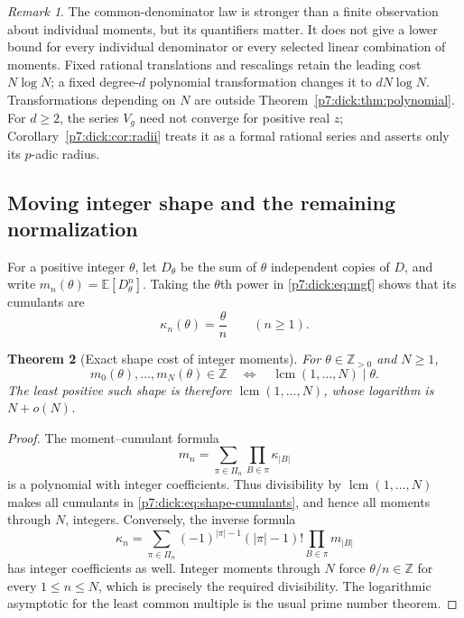 \documentclass[11pt,a4paper]{article}
\newtheorem{theorem}{Theorem}[section]
\theoremstyle{definition}
\theoremstyle{remark}
\newtheorem{remark}[theorem]{Remark}
\newcommand{\Z}{\mathbb Z}
\DeclareMathOperator{\lcm}{lcm}
\numberwithin{equation}{section}
\begin{document}
\begin{remark}\label{p7:dick:rem:scope}
The common-denominator law is stronger than a finite observation about
individual moments, but its quantifiers matter.  It does not give a lower
bound for every individual denominator or every selected linear combination
of moments.  Fixed rational translations and rescalings retain the leading
cost $N\log N$; a fixed degree-$d$ polynomial transformation changes it to
$dN\log N$.  Transformations depending on $N$ are outside
Theorem~\ref{p7:dick:thm:polynomial}.  For $d\ge2$, the series $V_g$ need not
converge for positive real $z$; Corollary~\ref{p7:dick:cor:radii} treats it as
a formal rational series and asserts only its $p$-adic radius.
\end{remark}

\subsection{Moving integer shape and the remaining normalization}

For a positive integer $\theta$, let $D_\theta$ be the sum of $\theta$
independent copies of $D$, and write
$m_n(\theta)=\mathbb E[D_\theta^n]$.  Taking the $\theta$th power in
\eqref{p7:dick:eq:mgf} shows that its cumulants are
\begin{equation}\label{p7:dick:eq:shape-cumulants}
 \kappa_n(\theta)=\frac{\theta}{n}\qquad(n\ge1).
\end{equation}

\begin{theorem}[Exact shape cost of integer moments]\label{p7:dick:thm:shape}
For $\theta\in\Z_{>0}$ and $N\ge1$,
\begin{equation}\label{p7:dick:eq:shape-integrality}
 m_0(\theta),\ldots,m_N(\theta)\in\Z
 \quad\Longleftrightarrow\quad
 \lcm(1,\ldots,N)\mid\theta.
\end{equation}
The least positive such shape is therefore $\lcm(1,\ldots,N)$, whose
logarithm is $N+o(N)$.
\end{theorem}
\begin{proof}
The moment--cumulant formula
\[
 m_n=\sum_{\pi\in\Pi_n}\prod_{B\in\pi}\kappa_{|B|}
\]
is a polynomial with integer coefficients.  Thus divisibility by
$\lcm(1,\ldots,N)$ makes all cumulants in
\eqref{p7:dick:eq:shape-cumulants}, and hence all moments through $N$,
integers.  Conversely, the inverse formula
\[
 \kappa_n=\sum_{\pi\in\Pi_n}
   (-1)^{|\pi|-1}(|\pi|-1)!\prod_{B\in\pi}m_{|B|}
\]
has integer coefficients as well.  Integer moments through $N$ force
$\theta/n\in\Z$ for every $1\le n\le N$, which is precisely the required
divisibility.  The logarithmic asymptotic for the least common multiple
is the usual prime number theorem.
\end{proof}
\end{document}
